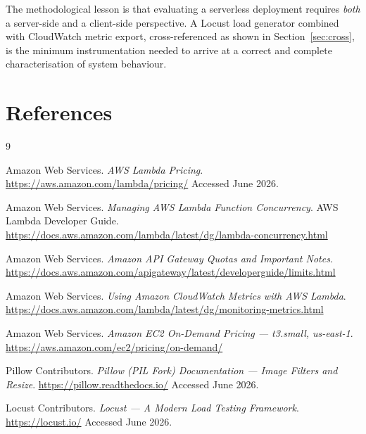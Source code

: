 \documentclass[10pt,twocolumn]{article}
\begin{document}
The methodological lesson is that evaluating a serverless deployment
requires \textit{both} a server-side and a client-side perspective. A Locust
load generator combined with CloudWatch metric export, cross-referenced as shown
in Section~\ref{sec:cross}, is the minimum instrumentation needed to arrive at
a correct and complete characterisation of system behaviour.

\section*{References}

\begingroup
\small
\renewcommand{\section}[2]{}
\begin{thebibliography}{9}

Amazon Web Services.
\textit{AWS Lambda Pricing}.
\url{https://aws.amazon.com/lambda/pricing/}
Accessed June 2026.

Amazon Web Services.
\textit{Managing AWS Lambda Function Concurrency}.
AWS Lambda Developer Guide.
\url{https://docs.aws.amazon.com/lambda/latest/dg/lambda-concurrency.html}

Amazon Web Services.
\textit{Amazon API Gateway Quotas and Important Notes}.
\url{https://docs.aws.amazon.com/apigateway/latest/developerguide/limits.html}

Amazon Web Services.
\textit{Using Amazon CloudWatch Metrics with AWS Lambda}.
\url{https://docs.aws.amazon.com/lambda/latest/dg/monitoring-metrics.html}

Amazon Web Services.
\textit{Amazon EC2 On-Demand Pricing --- t3.small, us-east-1}.
\url{https://aws.amazon.com/ec2/pricing/on-demand/}

Pillow Contributors.
\textit{Pillow (PIL Fork) Documentation --- Image Filters and Resize}.
\url{https://pillow.readthedocs.io/}
Accessed June 2026.

Locust Contributors.
\textit{Locust --- A Modern Load Testing Framework}.
\url{https://locust.io/}
Accessed June 2026.

\end{thebibliography}
\endgroup
\end{document}
